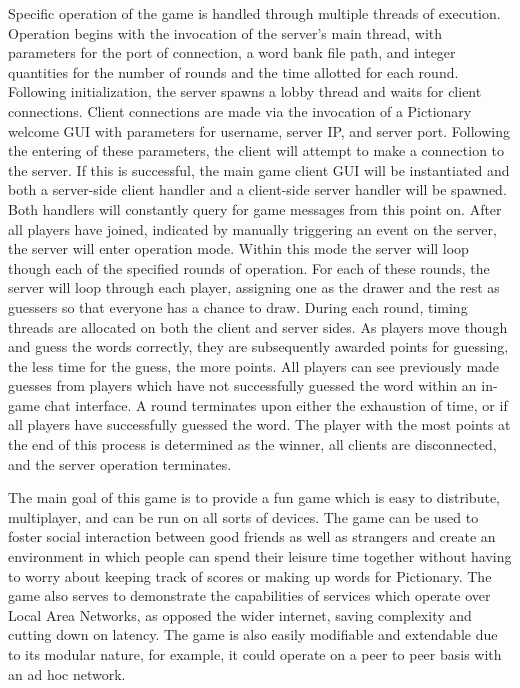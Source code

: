 \documentclass[12pt,letterpaper]{article}
\begin{document}
Specific operation of the game is handled through multiple threads of execution. Operation begins with the invocation of the server’s main thread, with parameters for the port of connection, a word bank file path, and integer quantities for the number of rounds and the time allotted for each round. Following initialization, the server spawns a lobby thread and waits for client connections. Client connections are made via the invocation of a Pictionary welcome GUI with parameters for username, server IP, and server port. Following the entering of these parameters, the client will attempt to make a connection to the server. If this is successful, the main game client GUI will be instantiated and both a server-side client handler and a client-side server handler will be spawned. Both handlers will constantly query for game messages from this point on. After all players have joined, indicated by manually triggering an event on the server, the server will enter operation mode. Within this mode the server will loop though each of the specified rounds of operation. For each of these rounds, the server will loop through each player, assigning one as the drawer and the rest as guessers so that everyone has a chance to draw. During each round, timing threads are allocated on both the client and server sides. As players move though and guess the words correctly, they are subsequently awarded points for guessing, the less time for the guess, the more points. All players can see previously made guesses from players which have not successfully guessed the word within an in-game chat interface. A round terminates upon either the exhaustion of time, or if all players have successfully guessed the word. The player with the most points at the end of this process is determined as the winner, all clients are disconnected, and the server operation terminates.

The main goal of this game is to provide a fun game which is easy to distribute, multiplayer, and can be run on all sorts of devices. The game can be used to foster social interaction between good friends as well as strangers and create an environment in which people can spend their leisure time together without having to worry about keeping track of scores or making up words for Pictionary. The game also serves to demonstrate the capabilities of services which operate over Local Area Networks, as opposed the wider internet, saving complexity and cutting down on latency. The game is also easily modifiable and extendable due to its modular nature, for example, it could operate on a peer to peer basis with an ad hoc network. 
\end{document}
